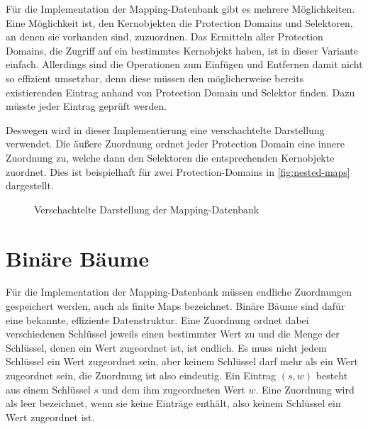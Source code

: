 \documentclass[a4paper, parskip]{scrartcl}
\begin{document}
Für die Implementation der Mapping-Datenbank gibt es mehrere Möglichkeiten.
Eine Möglichkeit ist, den Kernobjekten die Protection Domains und Selektoren, an denen sie vorhanden sind, zuzuordnen.
Das Ermitteln aller Protection Domains, die Zugriff auf ein bestimmtes Kernobjekt haben, ist in dieser Variante einfach.
Allerdings sind die Operationen zum Einfügen und Entfernen damit nicht so effizient umsetzbar, denn diese müssen den möglicherweise bereits existierenden Eintrag anhand von Protection Domain und Selektor finden. 
Dazu müsste jeder Eintrag geprüft werden.

Deswegen wird in dieser Implementierung eine verschachtelte Darstellung verwendet.
Die äußere Zuordnung ordnet jeder Protection Domain eine innere Zuordnung zu, welche dann den Selektoren die entsprechenden Kernobjekte zuordnet.
Dies ist beispielhaft für zwei Protection-Domains in \autoref{fig:nested-maps} dargestellt.

\begin{figure}
  \centering
  \caption{Verschachtelte Darstellung der Mapping-Datenbank}
  \label{fig:nested-maps}  
\end{figure}

\section{Binäre Bäume}

Für die Implementation der Mapping-Datenbank müssen endliche Zuordnungen gespeichert werden, auch als finite Maps bezeichnet.
Binäre Bäume sind dafür eine bekannte, effiziente Datenstruktur.
Eine Zuordnung ordnet dabei verschiedenen Schlüssel jeweils einen bestimmter Wert zu und die Menge der Schlüssel, denen ein Wert zugeordnet ist, ist endlich. 
Es muss nicht jedem Schlüssel ein Wert zugeordnet sein, aber keinem Schlüssel darf mehr als ein Wert zugeordnet sein, die Zuordnung ist also eindeutig.
Ein Eintrag $(s, w)$ besteht aus einem Schlüssel $s$ und dem ihm zugeordneten Wert $w$. 
Eine Zuordnung wird als leer bezeichnet, wenn sie keine Einträge enthält, also keinem Schlüssel ein Wert zugeordnet ist.
\end{document}
